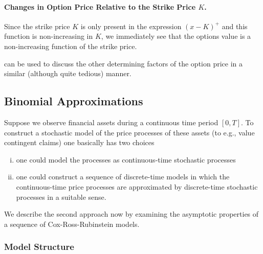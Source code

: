 \paragraph{Changes in Option Price Relative to the Strike Price $K$.}

Since the strike price $K$ is only present in the expression $(x - K)^{+}$ and this function is non-increasing in $K$, we immediately see that the options value is a non-increasing function of the strike price.

 can be used to discuss the other determining factors of the option price in a similar (although quite tedious) manner.

\subsection{Binomial Approximations}

Suppose we observe financial assets during a continuous time period $[0, T]$. To construct a stochastic model of the price processes of these assets (to e.g., value contingent claims) one basically has two choices

\begin{enumerate}[(i)]
	\item one could model the processes as continuous-time stochastic processes
	\item one could construct a sequence of discrete-time models in which the continuous-time price processes are approximated by discrete-time stochastic processes in a suitable sense.
\end{enumerate}

We describe the second approach now by examining the asymptotic properties of a sequence of Cox-Ross-Rubinstein models.

\subsubsection{Model Structure}

